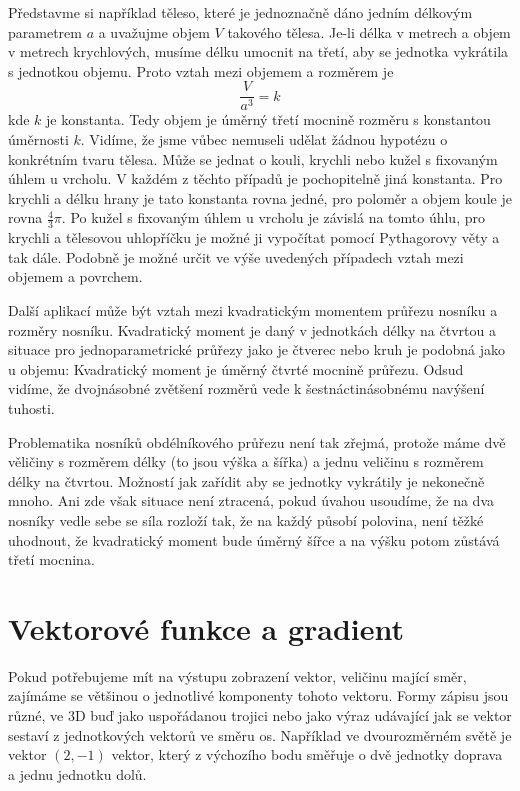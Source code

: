 \documentclass[12pt]{article}
\begin{document}
Představme si například těleso, které je jednoznačně dáno jedním délkovým parametrem $a$ a uvažujme objem $V$ takového tělesa. Je-li délka v metrech a objem v metrech krychlových, musíme délku umocnit na třetí, aby se jednotka vykrátila s jednotkou objemu. Proto vztah mezi objemem a rozměrem je $$\frac{V}{a^3}=k$$
kde $k$ je konstanta. Tedy objem je úměrný třetí mocnině rozměru s konstantou úměrnosti $k$. Vidíme, že jsme vůbec nemuseli udělat žádnou hypotézu o konkrétním tvaru tělesa. Může se jednat o kouli, krychli nebo kužel s fixovaným úhlem u vrcholu. V každém z těchto případů je pochopitelně jiná konstanta. Pro krychli a délku hrany je tato konstanta rovna jedné, pro poloměr a objem koule je rovna $\frac 43 \pi$. Po kužel s fixovaným úhlem u vrcholu je závislá na tomto úhlu, pro krychli a tělesovou uhlopříčku je možné ji vypočítat pomocí Pythagorovy věty a tak dále. Podobně je možné určit ve výše uvedených případech vztah mezi objemem a povrchem.

Další aplikací může být vztah mezi kvadratickým momentem průřezu nosníku a rozměry nosníku. Kvadratický moment je daný v jednotkách délky na čtvrtou a situace pro jednoparametrické průřezy jako je čtverec nebo kruh je podobná jako u objemu: Kvadratický moment je úměrný čtvrté mocnině průřezu. Odsud vidíme, že dvojnásobné zvětšení rozměrů vede k šestnáctinásobnému navýšení tuhosti.

Problematika nosníků obdélníkového průřezu není tak zřejmá, protože máme dvě věličiny s rozměrem délky (to jsou výška a šířka) a jednu veličinu s rozměrem délky na čtvrtou. Možností jak zařídit aby se jednotky vykrátily je nekonečně mnoho. Ani zde však situace není ztracená, pokud úvahou usoudíme, že na dva nosníky vedle sebe se síla rozloží tak, že na každý působí polovina, není těžké uhodnout, že kvadratický moment bude úměrný šířce a na výšku potom zůstává třetí mocnina. 


\section*{Vektorové funkce a gradient}

Pokud potřebujeme mít na výstupu zobrazení vektor, veličinu mající směr, zajímáme se většinou o jednotlivé komponenty tohoto vektoru. Formy zápisu jsou různé, ve 3D buď jako uspořádanou trojici nebo jako výraz udávající jak se vektor sestaví z jednotkových vektorů ve směru os. Například ve dvourozměrném světě je vektor $(2,-1)$ vektor, který z výchozího bodu směřuje o dvě jednotky doprava a jednu jednotku dolů.
\end{document}

